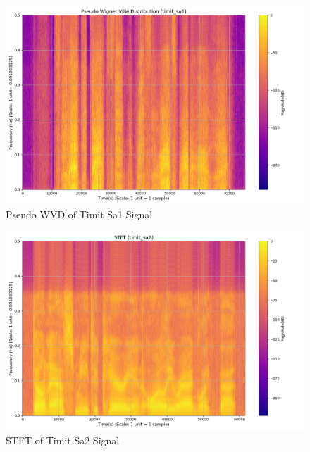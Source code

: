 \documentclass[12pt,a4paper,onecolumn]{exam}
\begin{document}
\begin{solution}
        \begin{figure}[H]
        \centering
        \includegraphics[scale = 0.35]{timit_sa1_pwvd.png}
        \caption{Pseudo WVD of Timit Sa1 Signal}
        \label{fig:52}
        \end{figure}      

        \begin{figure}[H]
        \centering
        \includegraphics[scale = 0.35]{timit_sa2_stft.png}
        \caption{STFT of Timit Sa2 Signal}
        \label{fig:53}
        \end{figure}


\end{solution}
\end{document}
